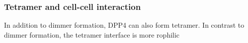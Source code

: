 \subsubsection{Tetramer and cell-cell interaction}

In addition to dimmer formation, DPP4 can also form tetramer. In contrast to dimmer formation, the tetramer interface is more rophilic 